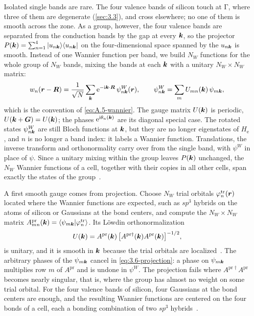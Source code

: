 Isolated single bands are rare. The four valence bands of silicon touch at $\mathrm{\Gamma}$, where three of them are degenerate (\cref{sec:3.3}), and cross elsewhere; no one of them is smooth across the zone. As a group, however, the four valence bands are separated from the conduction bands by the gap at every $\bm{k}$, so the projector $P(\bm{k}) = \sum_{n=1}^{4}|u_{n\bm{k}}\rangle\langle u_{n\bm{k}}|$ on the four-dimensional space spanned by the $u_{n\bm{k}}$ is smooth. Instead of one Wannier function per band, we build $N_W$ functions for the whole group of $N_W$ bands, mixing the bands at each $\bm{k}$ with a unitary $N_W\times N_W$ matrix:
\begin{equation}
  w_n(\bm{r} - \bm{R}) = \frac{1}{\sqrt N}\sum_{\bm{k}}\mathrm{e}^{-\mathrm{i}\bm{k}\cdot\bm{R}}\,\psi^W_{n\bm{k}}(\bm{r}), \qquad
  \psi^W_{n\bm{k}} = \sum_m U_{mn}(\bm{k})\,\psi_{m\bm{k}} ,
  \label{eq:3.6-wannier}
\end{equation}
which is the convention of \cref{eq:A.5-wannier}. The gauge matrix $U(\bm{k})$ is periodic, $U(\bm{k} + \bm{G}) = U(\bm{k})$; the phases $\mathrm{e}^{\mathrm{i}\theta_n(\bm{k})}$ are its diagonal special case. The rotated states $\psi^W_{n\bm{k}}$ are still Bloch functions at $\bm{k}$, but they are no longer eigenstates of $H_{\mathrm{e}}$, and $n$ is no longer a band index: it labels a Wannier function. Translations, the inverse transform and orthonormality carry over from the single band, with $\psi^W$ in place of $\psi$. Since a unitary mixing within the group leaves $P(\bm{k})$ unchanged, the $N_W$ Wannier functions of a cell, together with their copies in all other cells, span exactly the states of the group~\cite[Eqs.~(8)--(10)]{marzari2012maximally}.

A first smooth gauge comes from projection. Choose $N_W$ trial orbitals $\varphi^{\mathrm{tr}}_n(\bm{r})$ located where the Wannier functions are expected, such as $sp^3$ hybrids on the atoms of silicon or Gaussians at the bond centers, and compute the $N_W\times N_W$ matrix $A^{\mathrm{pr}}_{mn}(\bm{k}) = \langle\psi_{m\bm{k}}|\varphi^{\mathrm{tr}}_n\rangle$. Its L\"owdin orthonormalization
\begin{equation}
  U(\bm{k}) = A^{\mathrm{pr}}(\bm{k})\,\bigl[A^{\mathrm{pr}\dagger}(\bm{k})A^{\mathrm{pr}}(\bm{k})\bigr]^{-1/2} ,
  \label{eq:3.6-projection}
\end{equation}
is unitary, and it is smooth in $\bm{k}$ because the trial orbitals are localized~\cite[Eqs.~(16) and (17)]{marzari2012maximally}. The arbitrary phases of the $\psi_{m\bm{k}}$ cancel in \cref{eq:3.6-projection}: a phase on $\psi_{m\bm{k}}$ multiplies row $m$ of $A^{\mathrm{pr}}$ and is undone in $\psi^W$. The projection fails where $A^{\mathrm{pr}\dagger}A^{\mathrm{pr}}$ becomes nearly singular, that is, where the group has almost no weight on some trial orbital. For the four valence bands of silicon, four Gaussians at the bond centers are enough, and the resulting Wannier functions are centered on the four bonds of a cell, each a bonding combination of two $sp^3$ hybrids~\cite[Fig.~2]{marzari2012maximally}.

